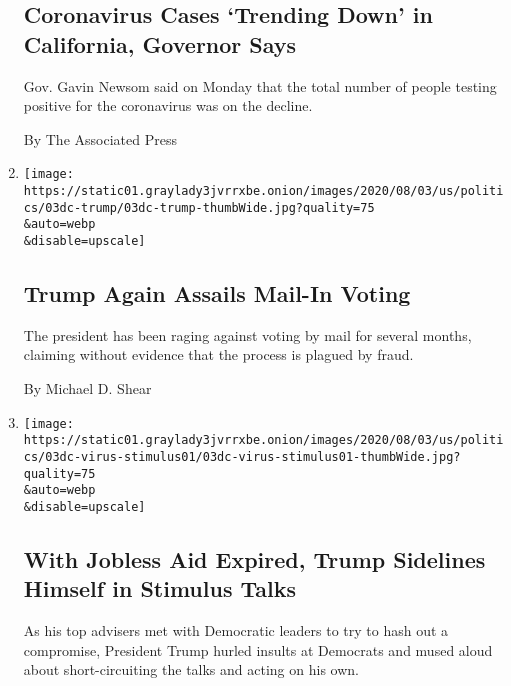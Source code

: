 \begin{enumerate}
  \hypertarget{coronavirus-cases-trending-down-in-california-governor-says}{%
  \subsection{Coronavirus Cases `Trending Down' in California, Governor
  Says}\label{coronavirus-cases-trending-down-in-california-governor-says}}

  Gov. Gavin Newsom said on Monday that the total number of people
  testing positive for the coronavirus was on the decline.

  By The Associated Press
\item
  \href{/2020/08/03/us/politics/trump-mail-in-voting.html}{}

  \texttt{[image: https://static01.graylady3jvrrxbe.onion/images/2020/08/03/us/politics/03dc-trump/03dc-trump-thumbWide.jpg?quality=75\\\&auto=webp\\\&disable=upscale]}

  \hypertarget{trump-again-assails-mail-in-voting}{%
  \subsection{Trump Again Assails Mail-In
  Voting}\label{trump-again-assails-mail-in-voting}}

  The president has been raging against voting by mail for several
  months, claiming without evidence that the process is plagued by
  fraud.

  By Michael D. Shear
\item
  \href{/2020/08/03/us/politics/congress-jobless-aid-talks-trump.html}{}

  \texttt{[image: https://static01.graylady3jvrrxbe.onion/images/2020/08/03/us/politics/03dc-virus-stimulus01/03dc-virus-stimulus01-thumbWide.jpg?quality=75\\\&auto=webp\\\&disable=upscale]}

  \hypertarget{with-jobless-aid-expired-trump-sidelines-himself-in-stimulus-talks}{%
  \subsection{With Jobless Aid Expired, Trump Sidelines Himself in
  Stimulus
  Talks}\label{with-jobless-aid-expired-trump-sidelines-himself-in-stimulus-talks}}

  As his top advisers met with Democratic leaders to try to hash out a
  compromise, President Trump hurled insults at Democrats and mused
  aloud about short-circuiting the talks and acting on his own.


\end{enumerate}
